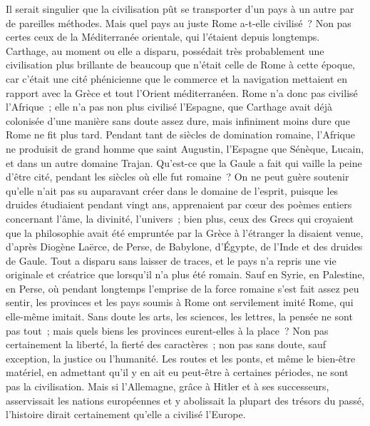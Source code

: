 \documentclass[french,twoside]{book} %
\begin{document}
Il serait singulier que la civilisation pût se transporter d'un pays à un autre par de pareilles méthodes. Mais quel pays au juste Rome a-t-elle civilisé ? Non pas certes ceux de la Méditerranée orientale, qui l'étaient depuis long­temps. Carthage, au moment ou elle a disparu, possédait très probablement une civilisation plus brillante de beaucoup que n'était celle de Rome à cette époque, car c'était une cité phénicienne que le commerce et la navigation mettaient en rapport avec la Grèce et tout l'Orient méditerranéen. Rome n'a donc pas civilisé l'Afrique ; elle n'a pas non plus civilisé l'Espagne, que Carthage avait déjà colonisée d'une manière sans doute assez dure, mais infiniment moins dure que Rome ne fit plus tard. Pendant tant de siècles de domination romaine, l'Afrique ne produisit de grand homme que saint Augus­tin, l'Espagne que Sénèque, Lucain, et dans un autre domaine Trajan. Qu'est-ce que la Gaule a fait qui vaille la peine d'être cité, pendant les siècles où elle fut romaine ? On ne peut guère soutenir qu'elle n'ait pas su auparavant créer dans le domaine de l'esprit, puisque les druides étudiaient pendant vingt ans, apprenaient par cœur des poèmes entiers concernant l'âme, la divinité, l'uni­vers ; bien plus, ceux des Grecs qui croyaient que la philosophie avait été empruntée par la Grèce à l'étranger la disaient venue, d'après Diogène Laërce, de Perse, de Babylone, d'Égypte, de l'Inde et des druides de Gaule. Tout a disparu sans laisser de traces, et le pays n'a repris une vie originale et créatrice que lorsqu'il n'a plus été romain. Sauf en Syrie, en Palestine, en Perse, où pendant longtemps l'emprise de la force romaine s'est fait assez peu sentir, les provinces et les pays soumis à Rome ont servilement imité Rome, qui elle-même imitait. Sans doute les arts, les sciences, les lettres, la pensée ne sont pas tout ; mais quels biens les provinces eurent-elles à la place ? Non pas certainement la liberté, la fierté des caractères ; non pas sans doute, sauf exception, la justice ou l'humanité. Les routes et les ponts, et même le bien-être matériel, en admettant qu'il y en ait eu peut-être à certaines périodes, ne sont pas la civilisation. Mais si l'Allemagne, grâce à Hitler et à ses succes­seurs, asservissait les nations européennes et y abolissait la plupart des trésors du passé, l'histoire dirait certainement qu'elle a civilisé l'Europe.\par
\end{document}
